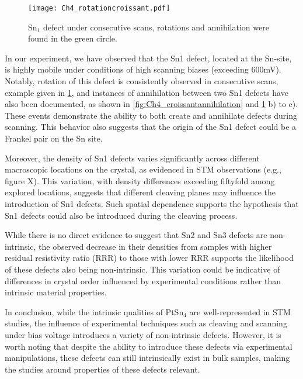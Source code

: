 \begin{figure}
	\centering
	\texttt{[image: Ch4\_rotationcroissant.pdf]}
	\caption{Sn$_1$ defect under consecutive scans, rotations and annihilation were found in the green circle.}
	\label{fig:Ch4_rotationcroissant}
\end{figure}
\par In our experiment, we have observed that the Sn1 defect, located at the Sn-site, is highly mobile under conditions of high scanning biases (exceeding 600mV). Notably, rotation of this defect is consistently observed in consecutive scans, example given in \ref{fig:Ch4_rotationcroissant}, and instances of annihilation between two Sn1 defects have also been documented, as shown in \ref{fig:Ch4_croissantannihilation} and \ref{fig:Ch4_rotationcroissant} b) to c). These events demonstrate the ability to both create and annihilate defects during scanning. This behavior also suggests that the origin of the Sn1 defect could be a Frankel pair on the Sn site. %
\par Moreover, the density of Sn1 defects varies significantly across different macroscopic locations on the crystal, as evidenced in STM observations (e.g., figure X). This variation, with density differences exceeding fiftyfold among explored locations, suggests that different cleaving planes may influence the introduction of Sn1 defects. Such spatial dependence supports the hypothesis that Sn1 defects could also be introduced during the cleaving process. 

\par While there is no direct evidence to suggest that Sn2 and Sn3 defects are non-intrinsic, the observed decrease in their densities from samples with higher residual resistivity ratio (RRR) to those with lower RRR supports the likelihood of these defects also being non-intrinsic. This variation could be indicative of differences in crystal order influenced by experimental conditions rather than intrinsic material properties.

\par In conclusion, while the intrinsic qualities of PtSn$_4$ are well-represented in STM studies, the influence of experimental techniques such as cleaving and scanning under bias voltage introduces a variety of non-intrinsic defects. However, it is worth noting that despite the ability to introduce these defects via experimental manipulations, these defects can still intrinsically exist in bulk samples, making the studies around properties of these defects relevant. 

